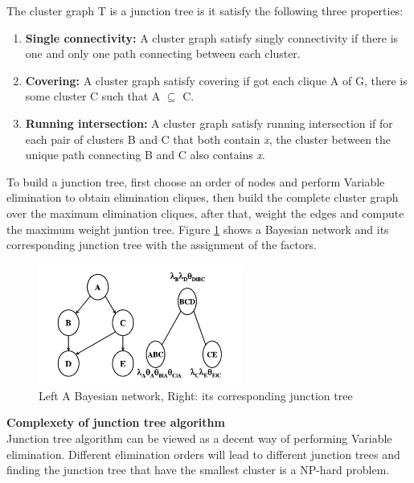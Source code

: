         The cluster graph T is a junction tree is it satisfy the following three properties:
        
        \begin{enumerate}
            \item \textbf{Single connectivity:} A cluster graph satisfy singly connectivity if there is one and only one path connecting between each cluster.
            \item \textbf{Covering:} A cluster graph satisfy covering if got each clique A of G, there is some cluster C such that A $\subseteq$ C.
            \item \textbf{Running intersection:}  A cluster graph satisfy  running intersection if for each pair of clusters B and C that both contain \textit{x}, the cluster between the unique path connecting B and C also contains \textit{x}.
        \end{enumerate}
        
        \noindent To build a junction tree, first choose an order of nodes and perform Variable elimination to obtain elimination cliques, then build the complete cluster graph over the maximum elimination cliques, after that, weight the edges and compute the maximum weight juntion tree.
        Figure \ref{fig:bayesjunc} shows a Bayesian network and its corresponding junction tree with the assignment of the factors.\\
        
        \begin{figure}
            \centering
            \includegraphics[width = 0.6\textwidth, height = 0.3\textwidth]{pic/bayesandjunctree.png}
            \caption{Left A Bayesian network, Right: its corresponding junction tree}
            \label{fig:bayesjunc}
        \end{figure}
        
        \noindent \textbf{Complexety of junction tree algorithm}\\
        
        \noindent Junction tree algorithm can be viewed as a decent way of performing Variable elimination. Different elimination orders will lead to different junction trees and finding the junction tree that have the smallest cluster is a NP-hard problem.\\
        
